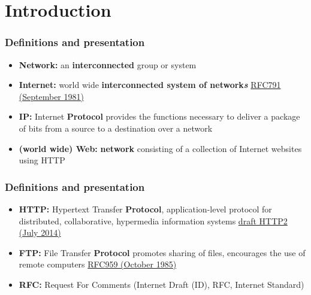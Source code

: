 \section{Introduction}
  \begin{frame}
    \frametitle{Definitions and presentation}
      \begin{itemize}
        \item \textbf{Network:} an \textbf{interconnected} group or system
        \item \textbf{Internet:} world wide \textbf{interconnected system of network\emph{s}} \color{blue}\href{http://tools.ietf.org/html/rfc791}{RFC791 (September 1981)}\color{black}
        \item \textbf{IP:} Internet \textbf{Protocol} provides the functions necessary to deliver a package of bits from a source to a destination over a network
        \item \textbf{(world wide) Web:} \textbf{network} consisting of a collection of Internet websites using HTTP
      \end{itemize}
  \end{frame}
  \begin{frame}
    \frametitle{Definitions and presentation}
      \begin{itemize}
        \item \textbf{HTTP:} Hypertext Transfer \textbf{Protocol}, application-level protocol for distributed, collaborative, hypermedia information systems \color{blue}\href{http://tools.ietf.org/html/draft-ietf-httpbis-http2-14}{draft HTTP2 (July 2014)} \color{black}
        \item \textbf{FTP:} File Transfer \textbf{Protocol} promotes sharing of files, encourages the use of remote computers \color{blue}\href{http://tools.ietf.org/html/rfc959}{RFC959 (October 1985)} \color{black}
        \item \textbf{RFC:} Request For Comments (Internet Draft (ID), RFC, Internet Standard)
      \end{itemize}
  \end{frame}
